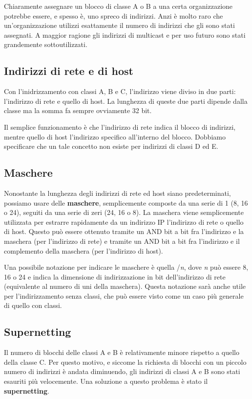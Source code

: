         Chiaramente assegnare un blocco di classe A o B a una certa organizzazione potrebbe essere, e spesso è, uno spreco di indirizzi. Anzi è molto raro che un'organizzazione utilizzi esattamente il numero di indirizzi che gli sono stati assegnati. A maggior ragione gli indirizzi di multicast e per uso futuro sono stati grandemente sottoutilizzati.
        
    \subsection{Indirizzi di rete e di host}
        Con l'inidrizzamento con classi A, B e C, l'indirizzo viene diviso in due parti: l'indirizzo di rete e quello di host. La lunghezza di queste due parti dipende dalla classe ma la somma fa sempre ovviamente 32 bit.
        
        Il semplice funzionamento è che l'indirizzo di rete indica il blocco di indirizzi, mentre quello di host l'indirizzo specifico all'interno del blocco. Dobbiamo specificare che un tale concetto non esiste per indirizzi di classi D ed E.
        
    \subsection{Maschere}
        Nonostante la lunghezza degli indirizzi di rete ed host siano predeterminati, possiamo usare delle \textbf{maschere}, semplicemente composte da una serie di 1 (8, 16 o 24), seguiti da una serie di zeri (24, 16 o 8). La maschera viene semplicemente utilizzata per estrarre rapidamente da un indirizzo IP l'indirizzo di rete o quello di host. Questo può essere ottenuto tramite un AND bit a bit fra l'indirizzo e la maschera (per l'indirizzo di rete) e tramite un AND bit a bit fra l'indirizzo e il complemento della maschera (per l'indirizzo di host).
        
        Una possibile notazione per indicare le maschere è quella /\textit{n}, dove \textit{n} può essere 8, 16 o 24 e indica la dimensione di indirizzazione in bit dell'indirizzo di rete (equivalente al numero di uni della maschera). Questa notazione sarà anche utile per l'indirizzamento senza classi, che può essere visto come un caso più generale di quello con classi.
        
    \subsection{Supernetting}
        Il numero di blocchi delle classi A e B è relativamente minore rispetto a quello della classe C. Per questo motivo, e siccome la richiesta di blocchi con un piccolo numero di indirizzi è andata diminuendo, gli indirizzi di classi A e B sono stati esauriti più velocemente. Una soluzione a questo problema è stato il \textbf{supernetting}.
        
